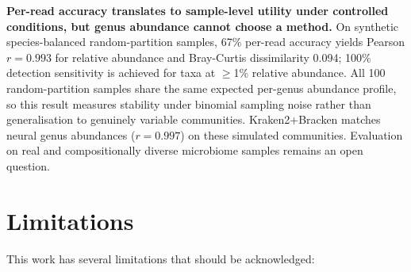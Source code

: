 \textbf{Per-read accuracy translates to sample-level utility under controlled conditions, but genus abundance cannot choose a method.} On synthetic species-balanced random-partition samples, 67\% per-read accuracy yields Pearson $r = 0.993$ for relative abundance and Bray-Curtis dissimilarity 0.094; 100\% detection sensitivity is achieved for taxa at $\geq$1\% relative abundance. All 100 random-partition samples share the same expected per-genus abundance profile, so this result measures stability under binomial sampling noise rather than generalisation to genuinely variable communities. Kraken2+Bracken matches neural genus abundances ($r = 0.997$) on these simulated communities. Evaluation on real and compositionally diverse microbiome samples remains an open question.

\section{Limitations}

This work has several limitations that should be acknowledged:

